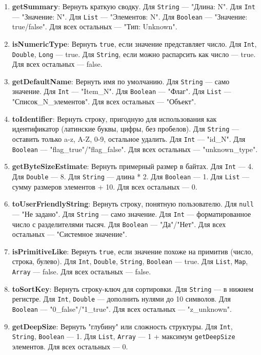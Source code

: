 \begin{enumerate}
    \item \textbf{getSummary}: Вернуть краткую сводку. Для \texttt{String} — "Длина: N". Для \texttt{Int} — "Значение: N". Для \texttt{List} — "Элементов: N". Для \texttt{Boolean} — "Значение: true/false". Для всех остальных — "Тип: Unknown".
    \item \textbf{isNumericType}: Вернуть \texttt{true}, если значение представляет число. Для \texttt{Int}, \texttt{Double}, \texttt{Long} — true. Для \texttt{String}, если можно распарсить как число — true. Для всех остальных — false.
    \item \textbf{getDefaultName}: Вернуть имя по умолчанию. Для \texttt{String} — само значение. Для \texttt{Int} — "Item\_N". Для \texttt{Boolean} — "Флаг". Для \texttt{List} — "Список\_N\_элементов". Для всех остальных — "Объект".
    \item \textbf{toIdentifier}: Вернуть строку, пригодную для использования как идентификатор (латинские буквы, цифры, без пробелов). Для \texttt{String} — оставить только a-z, A-Z, 0-9, остальное удалить. Для \texttt{Int} — "id\_N". Для \texttt{Boolean} — "flag\_true"/"flag\_false". Для всех остальных — "unknown\_type".
    \item \textbf{getByteSizeEstimate}: Вернуть примерный размер в байтах. Для \texttt{Int} — 4. Для \texttt{Double} — 8. Для \texttt{String} — длина * 2. Для \texttt{Boolean} — 1. Для \texttt{List} — сумму размеров элементов + 10. Для всех остальных — 0.
    \item \textbf{toUserFriendlyString}: Вернуть строку, понятную пользователю. Для \texttt{null} — "Не задано". Для \texttt{String} — само значение. Для \texttt{Int} — форматированное число с разделителями тысяч. Для \texttt{Boolean} — "Да"/"Нет". Для всех остальных — "Системное значение".
    \item \textbf{isPrimitiveLike}: Вернуть \texttt{true}, если значение похоже на примитив (число, строка, булево). Для \texttt{Int}, \texttt{Double}, \texttt{String}, \texttt{Boolean} — true. Для \texttt{List}, \texttt{Map}, \texttt{Array} — false. Для всех остальных — false.
    \item \textbf{toSortKey}: Вернуть строку-ключ для сортировки. Для \texttt{String} — в нижнем регистре. Для \texttt{Int}, \texttt{Double} — дополнить нулями до 10 символов. Для \texttt{Boolean} — "0\_false"/"1\_true". Для всех остальных — "z\_unknown".
    \item \textbf{getDeepSize}: Вернуть "глубину" или сложность структуры. Для \texttt{Int}, \texttt{String}, \texttt{Boolean} — 1. Для \texttt{List}, \texttt{Array} — 1 + максимум \texttt{getDeepSize} элементов. Для всех остальных — 0.
\end{enumerate}